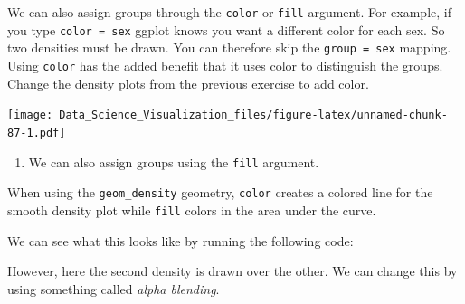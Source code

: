\documentclass[
]{article}
\newenvironment{Shaded}{\begin{snugshade}}{\end{snugshade}}
\newcommand{\CommentTok}[1]{\textcolor[rgb]{0.56,0.35,0.01}{\textit{#1}}}
\newcommand{\DataTypeTok}[1]{\textcolor[rgb]{0.13,0.29,0.53}{#1}}
\newcommand{\FloatTok}[1]{\textcolor[rgb]{0.00,0.00,0.81}{#1}}
\newcommand{\KeywordTok}[1]{\textcolor[rgb]{0.13,0.29,0.53}{\textbf{#1}}}
\newcommand{\NormalTok}[1]{#1}
\newcommand{\OperatorTok}[1]{\textcolor[rgb]{0.81,0.36,0.00}{\textbf{#1}}}
\newcommand{\StringTok}[1]{\textcolor[rgb]{0.31,0.60,0.02}{#1}}
\providecommand{\tightlist}{%
  \setlength{\itemsep}{0pt}\setlength{\parskip}{0pt}}
\begin{document}
We can also assign groups through the \texttt{color} or \texttt{fill}
argument. For example, if you type \texttt{color\ =\ sex} ggplot knows
you want a different color for each sex. So two densities must be drawn.
You can therefore skip the \texttt{group\ =\ sex} mapping. Using
\texttt{color} has the added benefit that it uses color to distinguish
the groups. Change the density plots from the previous exercise to add
color.

\begin{Shaded}
\end{Shaded}

\texttt{[image: Data\_Science\_Visualization\_files/figure-latex/unnamed-chunk-87-1.pdf]}

\begin{enumerate}
\def\labelenumi{\arabic{enumi}.}
\setcounter{enumi}{21}
\tightlist
\item
  We can also assign groups using the \texttt{fill} argument.
\end{enumerate}

When using the \texttt{geom\_density} geometry, \texttt{color} creates a
colored line for the smooth density plot while \texttt{fill} colors in
the area under the curve.

We can see what this looks like by running the following code:

\begin{Shaded}
\end{Shaded}

However, here the second density is drawn over the other. We can change
this by using something called \emph{alpha blending}.

\begin{Shaded}
\end{Shaded}
\end{document}
